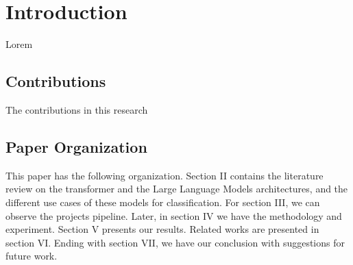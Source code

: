 \documentclass[chapters]{IEEEtran}
\begin{document}
\section{Introduction}
Lorem 

\subsection{Contributions}
The contributions in this research

\subsection{Paper Organization}
This paper has the following organization. Section
II contains the literature review on the transformer and the Large Language Models architectures, and the different use cases of these models for classification. For section III, we can observe the projects pipeline. Later, in section IV we have the methodology and experiment. Section V presents our results. Related works are presented in section VI. Ending with section VII, we have our conclusion with suggestions for future work.
\end{document}
